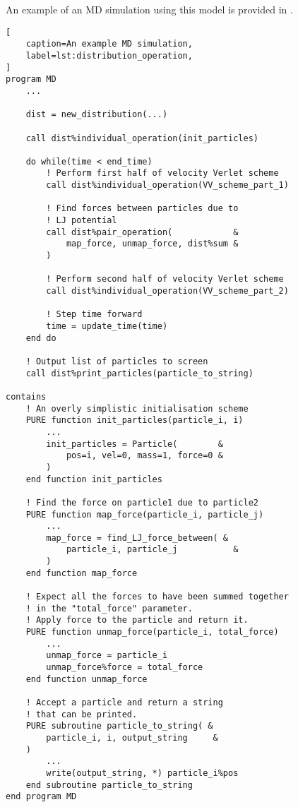 An example of an MD simulation using this model is provided in
.

\begin{lstlisting}[
    caption=An example MD simulation,
    label=lst:distribution_operation,
]
program MD
    ...

    dist = new_distribution(...)

    call dist%individual_operation(init_particles)

    do while(time < end_time)
        ! Perform first half of velocity Verlet scheme
        call dist%individual_operation(VV_scheme_part_1)

        ! Find forces between particles due to
        ! LJ potential
        call dist%pair_operation(            &
            map_force, unmap_force, dist%sum &
        )

        ! Perform second half of velocity Verlet scheme
        call dist%individual_operation(VV_scheme_part_2)

        ! Step time forward
        time = update_time(time)
    end do

    ! Output list of particles to screen
    call dist%print_particles(particle_to_string)

contains
    ! An overly simplistic initialisation scheme
    PURE function init_particles(particle_i, i)
        ...
        init_particles = Particle(        &
            pos=i, vel=0, mass=1, force=0 &
        )
    end function init_particles

    ! Find the force on particle1 due to particle2
    PURE function map_force(particle_i, particle_j)
        ...
        map_force = find_LJ_force_between( &
            particle_i, particle_j           &
        )
    end function map_force

    ! Expect all the forces to have been summed together
    ! in the "total_force" parameter.
    ! Apply force to the particle and return it.
    PURE function unmap_force(particle_i, total_force)
        ...
        unmap_force = particle_i
        unmap_force%force = total_force
    end function unmap_force

    ! Accept a particle and return a string
    ! that can be printed.
    PURE subroutine particle_to_string( &
        particle_i, i, output_string     &
    )
        ...
        write(output_string, *) particle_i%pos
    end subroutine particle_to_string
end program MD
\end{lstlisting}



